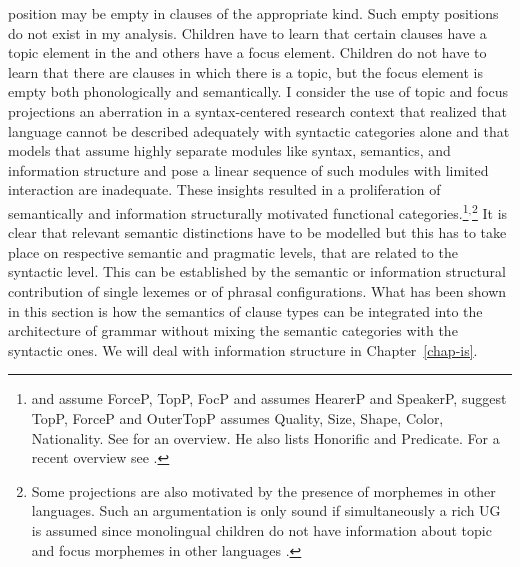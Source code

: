 position may be empty in clauses of the appropriate kind. Such empty positions do not exist in my
analysis.
Children have to learn that certain clauses have a topic element in the \vf and others have a focus
element. Children do not have to learn that there are clauses in which there is a topic, but the
focus element is empty both phonologically and semantically. I consider the use of topic and focus
projections an aberration in a syntax-centered research context that realized that language cannot
be described adequately with syntactic categories alone and that models that assume highly separate modules
like syntax, semantics, and information structure and pose a linear sequence of such modules with
limited interaction are inadequate. These insights resulted in a proliferation of semantically and
information structurally motivated functional categories.\footnote{
 \citet{Rizzi97a-u} and \citet[]{Grewendorf2002a} assume ForceP, TopP, FocP  and
 \citet[]{Poletto2000a-u} assumes HearerP and SpeakerP,  \citet*{WHBH2007a-u} suggest TopP, ForceP and OuterTopP
\citet[, 99]{Cinque94a-u} assumes Quality, Size, Shape, Color, Nationality.
See \citet[]{Webelhuth95a} for an overview. He also lists Honorific and Predicate. For a
recent overview see .
}$^,$\footnote{
Some projections are also motivated by the presence of morphemes in other languages. Such an
argumentation is only sound if simultaneously a rich UG is assumed since monolingual children do not
have information about topic and focus morphemes in other languages
\citep[Section~2]{MuellerCoreGram}.%
} It is clear that relevant semantic distinctions have to be modelled but this has to take place on
respective semantic and pragmatic levels, that are related to the syntactic level. This can be
established by the semantic or information structural contribution of single lexemes or of phrasal
configurations. What has been shown in this section is how the semantics of clause types can be
integrated into the architecture of grammar without mixing the semantic categories with the
syntactic ones. We will deal with information structure in Chapter~\ref{chap-is}.



